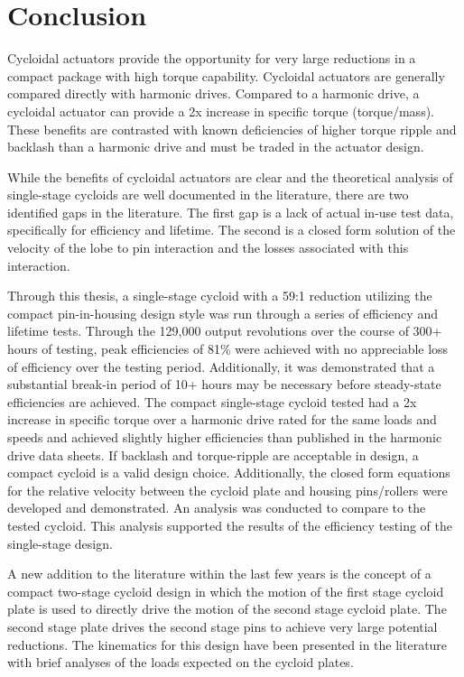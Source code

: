 
\chapter{Conclusion}\label{ch:conclusion}

Cycloidal actuators provide the opportunity for very large reductions in a compact package with high torque capability. Cycloidal actuators are generally compared directly with harmonic drives. Compared to a harmonic drive, a cycloidal actuator can provide a 2x increase in specific torque (torque/mass). These benefits are contrasted with known deficiencies of higher torque ripple and backlash than a harmonic drive and must be traded in the actuator design. 

While the benefits of cycloidal actuators are clear and the theoretical analysis of single-stage cycloids are well documented in the literature, there are two identified gaps in the literature. The first gap is a lack of actual in-use test data, specifically for efficiency and lifetime. The second is a closed form solution of the velocity of the lobe to pin interaction and the losses associated with this interaction. 

Through this thesis, a single-stage cycloid with a 59:1 reduction utilizing the compact pin-in-housing design style was run through a series of efficiency and lifetime tests. Through the 129,000 output revolutions over the course of 300+ hours of testing, peak efficiencies of 81\% were achieved with no appreciable loss of efficiency over the testing period. Additionally, it was demonstrated that a substantial break-in period of 10+ hours may be necessary before steady-state efficiencies are achieved. The compact single-stage cycloid tested had a 2x increase in specific torque over a harmonic drive rated for the same loads and speeds and achieved slightly higher efficiencies than published in the harmonic drive data sheets. If backlash and torque-ripple are acceptable in design, a compact cycloid is a valid design choice. Additionally, the closed form equations for the relative velocity between the cycloid plate and housing pins/rollers were developed and demonstrated. An analysis was conducted to compare to the tested cycloid. This analysis supported the results of the efficiency testing of the single-stage design.

A new addition to the literature within the last few years is the concept of a compact two-stage cycloid design in which the motion of the first stage cycloid plate is used to directly drive the motion of the second stage cycloid plate. The second stage plate drives the second stage pins to achieve very large potential reductions. The kinematics for this design have been presented in the literature with brief analyses of the loads expected on the cycloid plates. 

